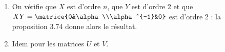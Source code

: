 \begin{enumerate}
 \item On vérifie que $X$ est d'ordre $n$, que $Y$ est d'ordre 2 et que $XY =\matrice{0&\alpha\\\alpha^{-1}&0}$ est d'ordre 2 : la proposition 3.74 donne alors le résultat.
 \item Idem pour les matrices $U$ et $V$.
\end{enumerate}

